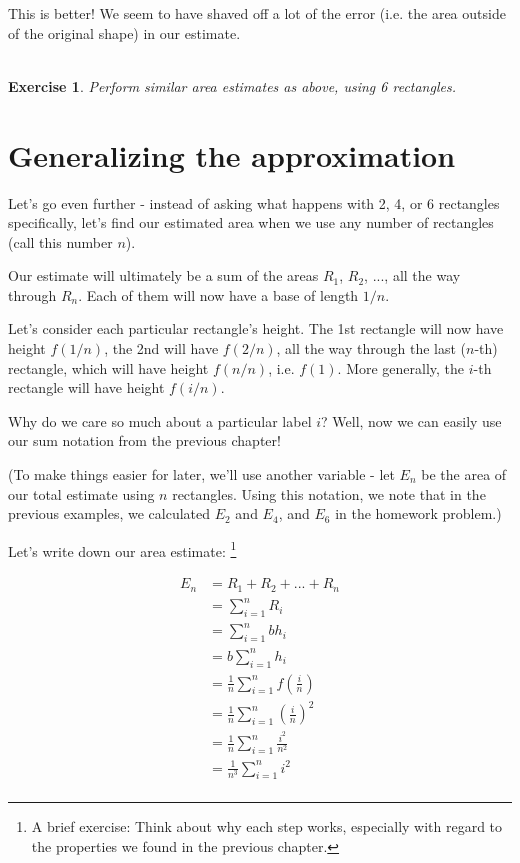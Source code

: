 \documentclass{article}
\newtheorem{exercise}{\\ \bf Exercise}
\begin{document}

This is better! We seem to have shaved off a lot of the error (i.e. the area outside of the original shape) in our estimate. 

\begin{exercise}
Perform similar area estimates as above, using 6 rectangles.
\end{exercise}


\section{Generalizing the approximation}

Let's go even further - instead of asking what happens with 2, 4, or 6 rectangles specifically, let's find our estimated area when we use any number of rectangles (call this number $n$). 

Our estimate will ultimately be a sum of the areas $R_1$, $R_2$, ..., all the way through $R_n$. Each of them will now have a base of length $1/n$. 

Let's consider each particular rectangle's height. The 1st rectangle will now have height $f(1/n)$, the 2nd will have $f(2/n)$, all the way through the last ($n$-th) rectangle, which will have height $f(n/n)$, i.e. $f(1)$. More generally, the $i$-th rectangle will have height $f(i/n)$. 



Why do we care so much about a particular label $i$? Well, now we can easily use our sum notation from the previous chapter! 

(To make things easier for later, we'll use another variable - let $E_n$ be the area of our total estimate using $n$ rectangles. Using this notation, we note that in the previous examples, we calculated $E_2$ and $E_4$, and $E_6$ in the homework problem.)

Let's write down our area estimate: \footnote{A brief exercise: Think about why each step works, especially with regard to the properties we found in the previous chapter.}


\begin{align*}
E_n &= R_1 + R_2 + ... + R_n \\
&= \sum_{i=1}^n R_i \\
&= \sum_{i=1}^n b h_i \\
&= b \sum_{i=1}^n h_i \\
&= \frac{1}{n} \sum_{i=1}^n f(\frac{i}{n}) \\
&= \frac{1}{n} \sum_{i=1}^n \left(\frac{i}{n}\right)^2 \\
&= \frac{1}{n} \sum_{i=1}^n \frac{i^2}{n^2} \\
&= \frac{1}{n^3} \sum_{i=1}^n i^2 \\
\end{align*}
\end{document}
